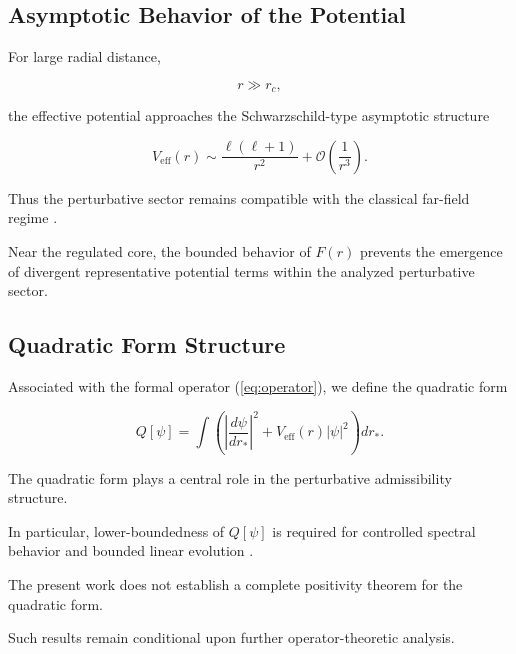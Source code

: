 
\subsection{Asymptotic Behavior of the Potential}

For large radial distance,

\begin{equation}
r \gg r_c,
\end{equation}

the effective potential approaches the Schwarzschild-type asymptotic structure

\begin{equation}
V_{\mathrm{eff}}(r)
\sim
\frac{\ell(\ell+1)}{r^2}
+
\mathcal{O}\!\left(\frac{1}{r^3}\right).
\end{equation}

Thus the perturbative sector remains compatible with the classical far-field regime \cite{wald1984,chandrasekhar1983}.

Near the regulated core, the bounded behavior of $F(r)$ prevents the emergence of divergent representative potential terms within the analyzed perturbative sector.


\subsection{Quadratic Form Structure}

Associated with the formal operator (\ref{eq:operator}), we define the quadratic form

\begin{equation}
Q[\psi]
=
\int
\left(
\left|
\frac{d\psi}{dr_*}
\right|^2
+
V_{\mathrm{eff}}(r)
|\psi|^2
\right)
dr_*.
\label{eq:quadratic_form}
\end{equation}

The quadratic form plays a central role in the perturbative admissibility structure.

In particular, lower-boundedness of $Q[\psi]$ is required for controlled spectral behavior and bounded linear evolution \cite{friedrichs1934,reedsimon2,kato1995}.

The present work does not establish a complete positivity theorem for the quadratic form.

Such results remain conditional upon further operator-theoretic analysis.

